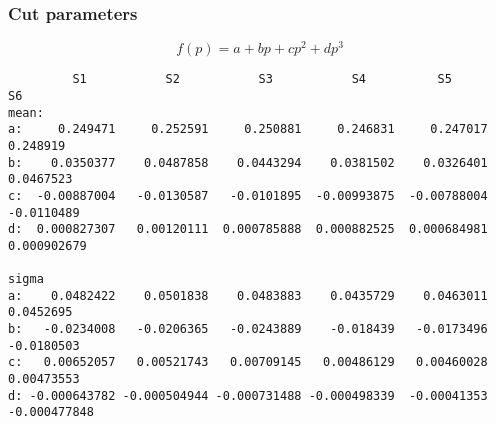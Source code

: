 \subsubsection{Cut parameters}\label{sec:ecp_parameters}
$$
f(p) = a + bp + cp^2 + dp^3
$$
\begin{verbatim}
         S1           S2           S3           S4          S5            S6
mean:
a:     0.249471     0.252591     0.250881     0.246831     0.247017     0.248919
b:    0.0350377    0.0487858    0.0443294    0.0381502    0.0326401    0.0467523
c:  -0.00887004   -0.0130587   -0.0101895  -0.00993875  -0.00788004   -0.0110489
d:  0.000827307   0.00120111  0.000785888  0.000882525  0.000684981  0.000902679

sigma 
a:    0.0482422    0.0501838    0.0483883    0.0435729    0.0463011    0.0452695
b:   -0.0234008   -0.0206365   -0.0243889    -0.018439   -0.0173496   -0.0180503
c:   0.00652057   0.00521743   0.00709145   0.00486129   0.00460028   0.00473553
d: -0.000643782 -0.000504944 -0.000731488 -0.000498339  -0.00041353 -0.000477848
\end{verbatim}
